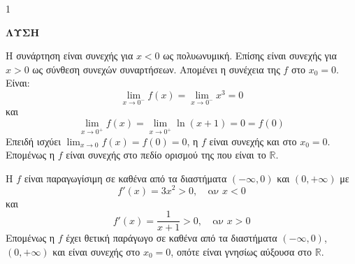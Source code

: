 \begin{ylh}{1}
    \item [Ύλη από εικόνα]
\end{ylh}
\textbf{ΛΥΣΗ}
\begin{alist}
\item Η συνάρτηση είναι συνεχής για $x<0$ ως πολυωνυμική. Επίσης είναι συνεχής για $x>0$ ως σύνθεση συνεχών συναρτήσεων. Απομένει η συνέχεια της $f$ στο $x_0 = 0$.
Είναι:
\[ \lim_{x \to 0^-} f(x) = \lim_{x \to 0^-} x^3 = 0 \]
και
\[ \lim_{x \to 0^+} f(x) = \lim_{x \to 0^+} \ln(x+1) = 0 = f(0) \]
Επειδή ισχύει $\lim_{x \to 0} f(x) = f(0) = 0$, η $f$ είναι συνεχής και στο $x_0 = 0$. Επομένως η $f$ είναι συνεχής στο πεδίο ορισμού της που είναι το $\mathbb{R}$.

\item Η $f$ είναι παραγωγίσιμη σε καθένα από τα διαστήματα $(-\infty, 0)$ και $(0, +\infty)$ με
\[ f'(x) = 3x^2 > 0, \quad \text{αν } x<0 \]
και
\[ f'(x) = \frac{1}{x+1} > 0, \quad \text{αν } x>0 \]
Επομένως η $f$ έχει θετική παράγωγο σε καθένα από τα διαστήματα $(-\infty, 0)$, $(0, +\infty)$ και είναι συνεχής στο $x_0 = 0$, οπότε είναι γνησίως αύξουσα στο $\mathbb{R}$.
\end{alist}
